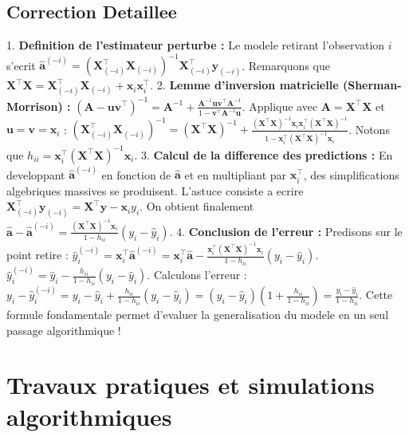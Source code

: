 \documentclass[11pt,a4paper]{report}
\begin{document}
\section{Correction Detaillee}
1. \textbf{Definition de l'estimateur perturbe :}
   Le modele retirant l'observation $i$ s'ecrit $\hat{\mathbf{a}}^{(-i)} = (\mathbf{X}_{(-i)}^\top \mathbf{X}_{(-i)})^{-1} \mathbf{X}_{(-i)}^\top \mathbf{y}_{(-i)}$.
   Remarquons que $\mathbf{X}^\top\mathbf{X} = \mathbf{X}_{(-i)}^\top \mathbf{X}_{(-i)} + \mathbf{x}_i \mathbf{x}_i^\top$.
2. \textbf{Lemme d'inversion matricielle (Sherman-Morrison) :}
   $(\mathbf{A} - \mathbf{u}\mathbf{v}^\top)^{-1} = \mathbf{A}^{-1} + \frac{\mathbf{A}^{-1}\mathbf{u}\mathbf{v}^\top\mathbf{A}^{-1}}{1 - \mathbf{v}^\top\mathbf{A}^{-1}\mathbf{u}}$.
   Applique avec $\mathbf{A} = \mathbf{X}^\top\mathbf{X}$ et $\mathbf{u}=\mathbf{v}=\mathbf{x}_i$ :
   $(\mathbf{X}_{(-i)}^\top \mathbf{X}_{(-i)})^{-1} = (\mathbf{X}^\top\mathbf{X})^{-1} + \frac{(\mathbf{X}^\top\mathbf{X})^{-1}\mathbf{x}_i\mathbf{x}_i^\top(\mathbf{X}^\top\mathbf{X})^{-1}}{1 - \mathbf{x}_i^\top(\mathbf{X}^\top\mathbf{X})^{-1}\mathbf{x}_i}$.
   Notons que $h_{ii} = \mathbf{x}_i^\top(\mathbf{X}^\top\mathbf{X})^{-1}\mathbf{x}_i$.
3. \textbf{Calcul de la difference des predictions :}
   En developpant $\hat{\mathbf{a}}^{(-i)}$ en fonction de $\hat{\mathbf{a}}$ et en multipliant par $\mathbf{x}_i^\top$, des simplifications algebriques massives se produisent. L'astuce consiste a ecrire $\mathbf{X}_{(-i)}^\top \mathbf{y}_{(-i)} = \mathbf{X}^\top\mathbf{y} - \mathbf{x}_i y_i$.
   On obtient finalement $\hat{\mathbf{a}} - \hat{\mathbf{a}}^{(-i)} = \frac{(\mathbf{X}^\top\mathbf{X})^{-1}\mathbf{x}_i}{1 - h_{ii}} (y_i - \hat{y}_i)$.
4. \textbf{Conclusion de l'erreur :}
   Predisons sur le point retire : $\hat{y}_{i}^{(-i)} = \mathbf{x}_i^\top \hat{\mathbf{a}}^{(-i)} = \mathbf{x}_i^\top \hat{\mathbf{a}} - \frac{\mathbf{x}_i^\top(\mathbf{X}^\top\mathbf{X})^{-1}\mathbf{x}_i}{1 - h_{ii}} (y_i - \hat{y}_i)$.
   $\hat{y}_{i}^{(-i)} = \hat{y}_i - \frac{h_{ii}}{1 - h_{ii}} (y_i - \hat{y}_i)$.
   Calculons l'erreur : $y_i - \hat{y}_{i}^{(-i)} = y_i - \hat{y}_i + \frac{h_{ii}}{1 - h_{ii}} (y_i - \hat{y}_i) = (y_i - \hat{y}_i) \left(1 + \frac{h_{ii}}{1 - h_{ii}}\right) = \frac{y_i - \hat{y}_i}{1 - h_{ii}}$.
   Cette formule fondamentale permet d'evaluer la generalisation du modele en un seul passage algorithmique !

\chapter{Travaux pratiques et simulations algorithmiques}
\end{document}
